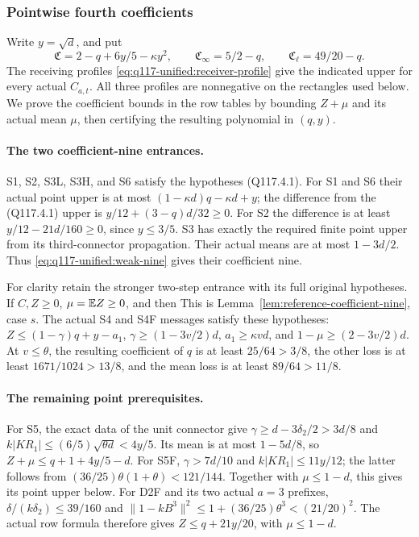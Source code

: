 \subsubsection{Pointwise fourth coefficients}
\label{sec:q117-unified:point-coefficients}

Write \(y=\sqrt d\), and put
\[
 \mathfrak C=2-q+6y/5-\kappa y^2,\qquad
 \mathfrak C_\infty=5/2-q,\qquad
 \mathfrak C_\ell=49/20-q.
\]
The receiving profiles \eqref{eq:q117-unified:receiver-profile}
give the indicated upper for every actual \(C_{a,t}\).
All three profiles are nonnegative on the rectangles used below.
We prove the coefficient bounds in the row tables by bounding
\(Z+\mu\) and its actual mean \(\mu\), then certifying the
resulting polynomial in \((q,y)\).

\paragraph{The two coefficient-nine entrances.}
S1, S2, S3L, S3H, and S6 satisfy the hypotheses (Q117.4.1).
For S1 and S6 their actual point upper is at most
\((1-\kappa d)q-\kappa d+y\); the difference from the
(Q117.4.1) upper is \(y/12+(3-q)d/32\ge0\).
For S2 the difference is at least \(y/12-21d/160\ge0\),
since \(y\le3/5\). S3 has exactly the required finite point
upper from its third-connector propagation.
Their actual means are at most \(1-3d/2\).
Thus \eqref{eq:q117-unified:weak-nine} gives their coefficient nine.

For clarity retain the stronger two-step entrance with its full
original hypotheses. If \(C,Z\ge0\), \(\mu=\mathbb E Z\ge0\), and
then
This is Lemma~\ref{lem:reference-coefficient-nine}, case \(s\).
The actual S4 and S4F messages satisfy these hypotheses:
\(Z\le(1-\gamma)q+y-a_1\),
\(\gamma\ge(1-3v/2)d\), \(a_1\ge\kappa vd\), and
\(1-\mu\ge(2-3v/2)d\).
At \(v\le\theta\), the resulting coefficient of \(q\) is at
least \(25/64>3/8\), the other loss is at least
\(1671/1024>13/8\), and the mean loss is at least
\(89/64>11/8\).

\paragraph{The remaining point prerequisites.}
For S5, the exact data of the unit connector give
\(\gamma\ge d-3\delta_2/2>3d/8\) and
\(k|KR_1|\le(6/5)\sqrt{\theta d}<4y/5\).
Its mean is at most \(1-5d/8\), so
\(Z+\mu\le q+1+4y/5-d\).
For S5F, \(\gamma>7d/10\) and
\(k|KR_1|\le11y/12\); the latter follows from
\((36/25)\theta(1+\theta)<121/144\).
Together with \(\mu\le1-d\), this gives its point upper below.
For D2F and its two actual \(a=3\) prefixes,
\(\delta/(k\delta_2)\le39/160\) and
\(\|1-kB^3\|^2\le1+(36/25)\theta^3<(21/20)^2\).
The actual row formula therefore gives
\(Z\le q+21y/20\), with \(\mu\le1-d\).

